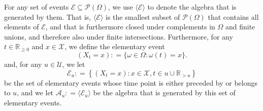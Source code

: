 \documentclass[10pt,a4paper]{paper}
\theoremstyle{definition}
\newcommand{\nats}{\mathbb{N}}
\newcommand{\reals}{\mathbb{R}}
\newcommand{\realsnonneg}{\reals_{\geq 0}}
\newcommand{\states}{\mathcal{X}}
\newcommand{\paths}{\Omega}
\newcommand{\power}{\mathcal{P}(\paths)}
\newcommand{\nonemptypower}{\power_{\emptyset}}
\newcommand{\events}{\mathcal{E}}
\newcommand{\filter}[1][t]{\mathcal{F}_{#1}}
\newcommand{\coloneqq}{:\!=}
\begin{document}
For any set of events $\mathcal{E}\subseteq\power$, we use $\langle\mathcal{E}\rangle$ to denote the algebra that is generated by them. That is, $\langle\mathcal{E}\rangle$ is the smallest subset of $\power$ that contains all elements of $\mathcal{E}$, and that is furthermore closed under complements in $\Omega$ and finite unions, and therefore also under finite intersections. 
Furthermore, for any $t\in\realsnonneg$ and $x\in\states$, we define the elementary event
\begin{equation*}
(X_t=x)\coloneqq\{\omega\in\paths\colon\omega(t)=x\}.
\end{equation*}
%
%
and, for any $u\in\mathcal{U}$, we let
\begin{equation*}
\mathcal{E}_u \coloneqq \left\{
(X_t=x)
\colon
x\in\states,t\in u\cup\reals_{>u}
\right\}
\end{equation*}
be the set of elementary events whose time point is either preceded by or belongs to $u$, and we let $\mathcal{A}_u\coloneqq\langle\mathcal{E}_u\rangle$ be the algebra that is generated by this set of elementary events. 
\end{document}
